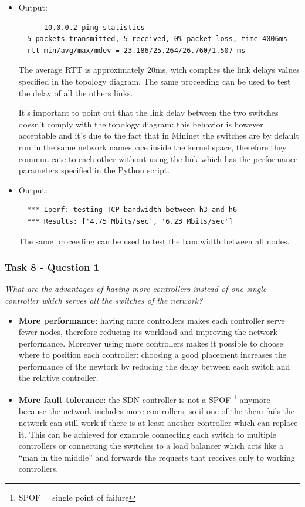 \begin{itemize}
  \item {}

  Output:
  \begin{lstlisting}
  --- 10.0.0.2 ping statistics ---
  5 packets transmitted, 5 received, 0% packet loss, time 4006ms
  rtt min/avg/max/mdev = 23.186/25.264/26.760/1.507 ms
  \end{lstlisting}
  The average RTT is approximately 20ms, wich complies the link delays values
  specified in the topology diagram. The same proceeding can be used to test the
  delay of all the others links.

  It's important to point out that the link delay between the two switches doesn't
  comply with the topology diagram: this behavior is however acceptable and it's due to
  the fact that in Mininet the switches are by default run in the same network
  namespace inside the kernel space, therefore they communicate to each other
  without using the link which has the performance parameters specified
  in the Python script.

  \item {}

  Output:
  \begin{lstlisting}
  *** Iperf: testing TCP bandwidth between h3 and h6
  *** Results: ['4.75 Mbits/sec', '6.23 Mbits/sec']
  \end{lstlisting}

  The same proceeding can be used to test the bandwidth between all nodes.
\end{itemize}



\subsubsection*{Task 8 - Question 1}
\textit{What are the advantages of having more controllers instead of
one single controller which serves all the switches of the network?}
\begin{itemize}
  \item \textbf{More performance}:  having more controllers makes each controller serve fewer
  nodes, therefore reducing its workload and improving the network performance.
  Moreover using more controllers makes it possible to choose where to position
  each controller: choosing a good placement increases the performance
  of the newtork by reducing the delay between each switch and the relative
  controller.
  \item \textbf{More fault tolerance}: the SDN controller is not a SPOF \footnote{SPOF = single point of failure}
  anymore because the network includes more controllers, so if one of the them
  fails the network can still work if there is at least another controller which can replace it.
  This can be achieved for example connecting each switch to multiple controllers
  or connecting the switches to a load balancer which acts like a ``man in the middle'' and
  forwards the requests that receives only to working controllers.
\end{itemize}


